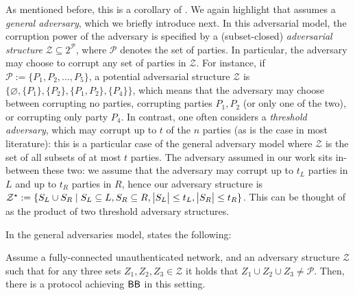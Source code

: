 \GeneralAdversaries*

As mentioned before, this is a corollary of \cite[{Theorem 2}]{DISC:FitMau98}. We again highlight that \cite{DISC:FitMau98} assumes a \emph{general adversary}, which we briefly introduce next. In this adversarial model, the corruption power of the adversary is specified by a (subset-closed) 
\emph{adversarial structure} $\mathcal{Z} \subseteq 2^\mathcal{P}$, where $\mathcal{P}$ denotes the set of parties. In particular, the adversary may choose to corrupt any set of parties in $\mathcal{Z}$.
For instance, if $\mathcal{P} := \{P_1, P_2, \ldots, P_5\}$, a potential adversarial structure $\mathcal{Z}$ is $\{\varnothing, \{P_1\}, \{P_2\}, \{P_1, P_2\}, \{P_4\}\}$, which means that the adversary may choose between corrupting no parties, corrupting parties $P_1, P_2$ (or only one of the two), or corrupting only party $P_4$. In contrast, one often considers a \emph{threshold adversary}, which may corrupt up to $t$ of the $n$ parties (as is the case in most literature): this is a particular case of the general adversary model where $\mathcal{Z}$ is the set of all subsets of at most $t$ parties. The adversary assumed in our work sits in-between these two: we assume that the adversary may corrupt up to $t_L$ parties in $L$ and up to $t_R$ parties in $R$, hence our adversary structure is $\mathcal{Z^\star} := \{S_L \cup S_R \mid S_L \subseteq L, S_R \subseteq R, \big\lvert S_L\big\rvert \leq t_L, \big\lvert S_R\big\rvert \leq t_R\}$. This can be thought of as the product of two threshold adversary structures.

In the general adversaries model, {\cite[{Theorem 2}]{DISC:FitMau98}} states the following:
\begin{theorem} \label{thm:general-adversaries-explicit}
    Assume a fully-connected unauthenticated network, and an adversary structure $\mathcal{Z}$ such that for any three sets $Z_1, Z_2, Z_3 \in \mathcal{Z}$ it holds that $Z_1 \cup Z_2 \cup Z_3 \neq \mathcal{P}$. Then, there is a protocol achieving $\textsf{BB}$ in this setting.
\end{theorem}

